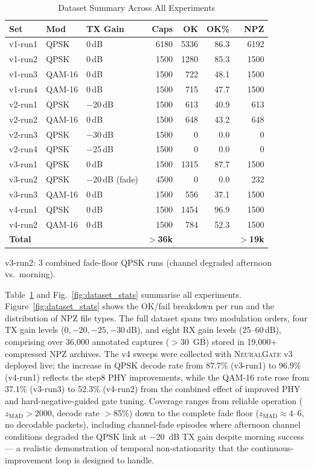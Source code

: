 \documentclass[conference]{IEEEtran}
\newcommand{\gate}{\textsc{NeuralGate}}
\newcommand{\Gz}{z_{\text{MAD}}}
\begin{document}
\begin{table}[t]
  \centering
  \caption{Dataset Summary Across All Experiments}
  \label{tab:dataset}
  \renewcommand{\arraystretch}{1.15}
  \begin{tabular}{lllrrrr}
    \toprule
    Set & Mod & TX Gain & Caps & OK & OK\% & NPZ \\
    \midrule
    v1-run1 & QPSK   &  0\,dB & 6180 & 5336 & 86.3 & 6192 \\
    v1-run2 & QPSK   &  0\,dB & 1500 & 1280 & 85.3 & 1500 \\
    v1-run3 & QAM-16 &  0\,dB & 1500 &  722 & 48.1 & 1500 \\
    v1-run4 & QAM-16 &  0\,dB & 1500 &  715 & 47.7 & 1500 \\
    v2-run1 & QPSK   & $-$20\,dB & 1500 &  613 & 40.9 &  613 \\
    v2-run2 & QAM-16 &  0\,dB & 1500 &  648 & 43.2 &  648 \\
    v2-run3 & QPSK   & $-$30\,dB & 1500 &    0 &  0.0 &    0 \\
    v2-run4 & QPSK   & $-$25\,dB & 1500 &    0 &  0.0 &    0 \\
    v3-run1 & QPSK   &  0\,dB & 1500 & 1315 & 87.7 & 1500 \\
    v3-run2 & QPSK   & $-$20\,dB (fade) & 4500 &    0 &  0.0 &  232 \\
    v3-run3 & QAM-16 &  0\,dB & 1500 &  556 & 37.1 & 1500 \\
    v4-run1 & QPSK   &  0\,dB & 1500 & 1454 & 96.9 & 1500 \\
    v4-run2 & QAM-16 &  0\,dB & 1500 &  784 & 52.3 & 1500 \\
    \midrule
    \textbf{Total} & & & \textbf{$>$36k} & & & \textbf{$>$19k} \\
    \bottomrule
  \end{tabular}
  \vspace{1pt}
  \footnotesize{v3-run2: 3 combined fade-floor QPSK runs (channel degraded afternoon vs.\ morning).}
\end{table}

Table~\ref{tab:dataset} and Fig.~\ref{fig:dataset_stats} summarise all
experiments.
Figure~\ref{fig:dataset_stats} shows the OK/fail breakdown per run and
the distribution of NPZ file types.
The full dataset spans two modulation orders, four TX gain levels
($0, -20, -25, -30$\,dB), and eight RX gain levels (25–60\,dB),
comprising over 36{,}000 annotated captures ($>$30~GB) stored in 19{,}000+
compressed NPZ archives.
The v4 sweeps were collected with \gate{} v3 deployed live; the increase in
QPSK decode rate from 87.7\% (v3-run1) to 96.9\% (v4-run1) reflects the
step8 PHY improvements, while the QAM-16 rate rose from 37.1\% (v3-run3)
to 52.3\% (v4-run2) from the combined effect of improved PHY and
hard-negative-guided gate tuning.
Coverage ranges from reliable operation
($\Gz > 2000$, decode rate $>$85\%) down to the complete fade floor
($\Gz \approx 4$–6, no decodable packets),
including channel-fade episodes where afternoon channel conditions
degraded the QPSK link at $-$20~dB TX gain despite morning success —
a realistic demonstration of temporal non-stationarity that the
continuous-improvement loop is designed to handle.
\end{document}
